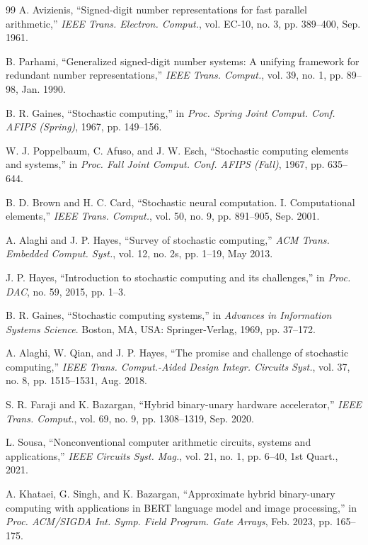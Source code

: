 \documentclass{solitairemiya-art}
\begin{document}
\begin{thebibliography}{99}
 A. Avizienis, ``Signed-digit number representations for fast parallel arithmetic,'' \textit{IEEE Trans. Electron. Comput.}, vol. EC-10, no. 3, pp. 389--400, Sep. 1961.

 B. Parhami, ``Generalized signed-digit number systems: A unifying framework for redundant number representations,'' \textit{IEEE Trans. Comput.}, vol. 39, no. 1, pp. 89--98, Jan. 1990.

 B. R. Gaines, ``Stochastic computing,'' in \textit{Proc. Spring Joint Comput. Conf. AFIPS (Spring)}, 1967, pp. 149--156.

 W. J. Poppelbaum, C. Afuso, and J. W. Esch, ``Stochastic computing elements and systems,'' in \textit{Proc. Fall Joint Comput. Conf. AFIPS (Fall)}, 1967, pp. 635--644.

 B. D. Brown and H. C. Card, ``Stochastic neural computation. I. Computational elements,'' \textit{IEEE Trans. Comput.}, vol. 50, no. 9, pp. 891--905, Sep. 2001.

 A. Alaghi and J. P. Hayes, ``Survey of stochastic computing,'' \textit{ACM Trans. Embedded Comput. Syst.}, vol. 12, no. 2s, pp. 1--19, May 2013.

 J. P. Hayes, ``Introduction to stochastic computing and its challenges,'' in \textit{Proc. DAC}, no. 59, 2015, pp. 1--3.

 B. R. Gaines, ``Stochastic computing systems,'' in \textit{Advances in Information Systems Science}. Boston, MA, USA: Springer-Verlag, 1969, pp. 37--172.

 A. Alaghi, W. Qian, and J. P. Hayes, ``The promise and challenge of stochastic computing,'' \textit{IEEE Trans. Comput.-Aided Design Integr. Circuits Syst.}, vol. 37, no. 8, pp. 1515--1531, Aug. 2018.

 S. R. Faraji and K. Bazargan, ``Hybrid binary-unary hardware accelerator,'' \textit{IEEE Trans. Comput.}, vol. 69, no. 9, pp. 1308--1319, Sep. 2020.

 L. Sousa, ``Nonconventional computer arithmetic circuits, systems and applications,'' \textit{IEEE Circuits Syst. Mag.}, vol. 21, no. 1, pp. 6--40, 1st Quart., 2021.

 A. Khataei, G. Singh, and K. Bazargan, ``Approximate hybrid binary-unary computing with applications in BERT language model and image processing,'' in \textit{Proc. ACM/SIGDA Int. Symp. Field Program. Gate Arrays}, Feb. 2023, pp. 165--175.


\end{thebibliography}
\end{document}
